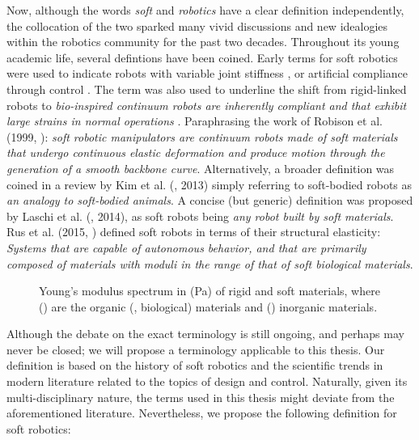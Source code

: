 %
Now, although the words \emph{soft} and \emph{robotics} have a clear definition independently, the collocation of the two sparked many vivid discussions and new idealogies within the robotics community for the past two decades. Throughout its young academic life, several defintions have been coined. Early terms for soft robotics were used to indicate robots with variable joint stiffness \cite{AlbuSchaffer2004}, or artificial compliance through control \cite{AlbuSchaffer2011}. The term was also used to underline the shift from rigid-linked robots to \textit{bio-inspired continuum robots are inherently compliant and that exhibit large strains in normal operations} \cite{Trivedi2008}. Paraphrasing the work of Robison et al. (1999, \cite{Robinson1999}): \textit{soft robotic manipulators are continuum robots made of soft materials that undergo continuous elastic deformation and produce motion through the generation of a smooth backbone curve}. Alternatively, a broader definition was coined in a review by Kim et al. (\cite{Kim2013}, 2013) simply referring to soft-bodied robots as \textit{an analogy to soft-bodied animals}. A concise (but generic) definition was proposed by Laschi et al. (\cite{Laschi2014}, 2014), as soft robots being \textit{any robot built by soft materials}. Rus et al. (2015, \cite{Rus2015}) defined soft robots in terms of their structural elasticity: \textit{Systems that are capable of autonomous behavior, and that are primarily composed of materials with moduli in the range of that of soft biological materials}.
%
\begin{figure}[!t]
  \ifx\printFigures\undefined
  \else
  \centering
  \vspace{-3mm}
  
  \fi
  \caption{Young's modulus spectrum in (\si{Pa}) of rigid and soft materials, where () are the organic (\ie, biological) materials and () inorganic materials. \label{fig:C0:elasticity}}
\end{figure}
%
\par Although the debate on the exact terminology is still ongoing, and perhaps may never be closed; we will propose a terminology applicable to this thesis. Our definition is based on the history of soft robotics and the scientific trends in modern literature related to the topics of design and control. Naturally, given its multi-disciplinary nature, the terms used in this thesis might deviate from the aforementioned literature. Nevertheless, we propose the following definition for soft robotics:
